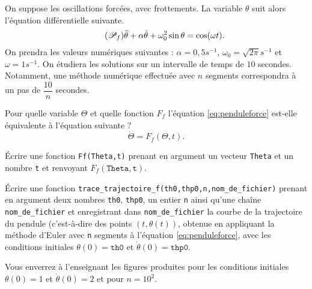 On suppose les oscillations forcées, avec frottements. 
La variable $\theta$ suit alors l'équation différentielle suivante.
\begin{equation}\label{eq:penduleforce}\tag{$\mathscr{P}_f$}
  \ddot{\theta} + \alpha\dot{\theta}+\omega_0^2\sin\theta = \cos(\omega t).
\end{equation}
On prendra les valeurs numériques suivantes : $\alpha = 0,5 s^{-1}$, $\omega_0 = \sqrt{2\pi} s^{-1}$ et $\omega = 1s^{-1}$.
On étudiera les solutions sur un intervalle de temps de $10$ secondes. 
Notamment, une méthode numérique effectuée avec $n$ segments correspondra à un pas de $\dfrac{10}{n}$ secondes. 

\question{} Pour quelle variable $\Theta$ et quelle fonction $F_f$ l'équation  \eqref{eq:penduleforce} est-elle équivalente à l'équation suivante ? 
\begin{equation*}
  \dot{\Theta} = F_f(\Theta, t).
\end{equation*}

\question{} \'Ecrire une fonction \texttt{Ff(Theta,t)} prenant en argument un vecteur \texttt{Theta} et un nombre \texttt{t} et renvoyant $F_f(\texttt{Theta},\texttt{t})$.


\medskip{}

\question{} \label{qu:trace_trajectoire_f} Écrire une fonction \texttt{trace\_trajectoire\_f(th0,thp0,n,nom\_de\_fichier)} prenant en argument deux nombres \texttt{th0}, \texttt{thp0}, un entier \texttt{n} ainsi qu'une chaîne \texttt{nom\_de\_fichier} et enregistrant dans \texttt{nom\_de\_fichier} la courbe de la trajectoire du pendule (c'est-à-dire des points $(t,\theta(t))$, obtenue en appliquant la méthode d'Euler avec \texttt{n} segments à l'équation \eqref{eq:penduleforce}, avec les conditions initiales  $ \theta(0) = \texttt{th0}$ et $\dot{\theta}(0) = \texttt{thp0}$.

Vous enverrez à l'enseignant les figures produites pour les conditions initiales $\theta(0) = 1$ et $\dot{\theta}(0) = 2$ et pour $n=10^2$. 

\medskip{}


